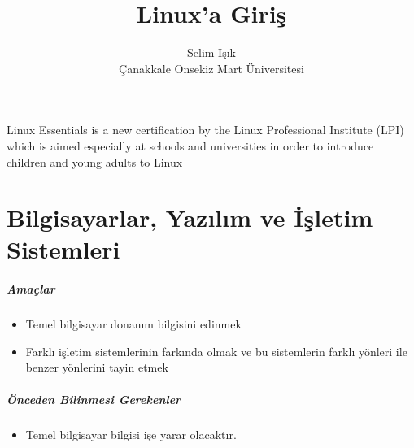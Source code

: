 \documentclass[10pt,a5paper]{book}
\begin{document}
\title{Linux'a Giriş}
\author{Selim Işık\\
Çanakkale Onsekiz Mart Üniversitesi}
\renewcommand{\today}{December 5, 2012}
\renewcommand*\chaptername{Bölüm}
\maketitle
Linux Essentials is a new certification by the Linux Professional Institute (LPI) which is aimed especially at schools and universities in order to introduce children and young adults to Linux
\renewcommand*\contentsname{İçindekiler}
\tableofcontents
\chapter{Bilgisayarlar, Yazılım ve İşletim Sistemleri}
\paragraph{Amaçlar}
\begin{itemize}
 \item Temel bilgisayar donanım bilgisini edinmek
 \item Farklı işletim sistemlerinin farkında olmak ve bu sistemlerin farklı yönleri ile benzer yönlerini tayin etmek
 \end{itemize}
 
\paragraph{Önceden Bilinmesi Gerekenler}
\begin{itemize}
 \item Temel bilgisayar bilgisi işe yarar olacaktır.
 \end{itemize}
\end{document}
